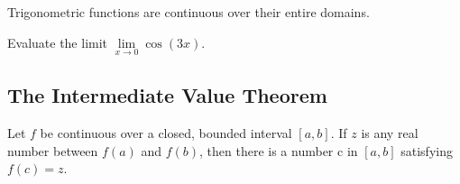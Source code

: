 \begin{theorem}

Trigonometric functions are continuous over their entire domains.

\end{theorem}



\begin{example}

Evaluate the limit \(\lim\limits_{x\to 0}\cos(3x)\).

\end{example}
\vspace*{6\baselineskip}

\hypertarget{the-intermediate-value-theorem}{%
\subsection{The Intermediate Value
Theorem}\label{the-intermediate-value-theorem}}

\begin{theorem}

  Let \(f\) be continuous over a closed, bounded interval \([a,b]\). If \(z\) is any real number between \(f(a)\)
and \(f(b)\), then there is a number c in \([a,b]\) satisfying
\(f(c)=z\).

\end{theorem}

